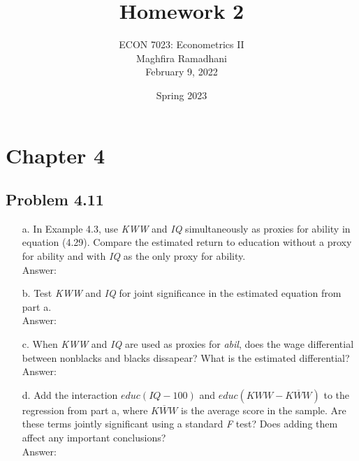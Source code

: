 \documentclass[10pt]{article}
\begin{document}
 
\title{Homework 2}
\author{ECON 7023: Econometrics II\\
Maghfira Ramadhani\\
February 9, 2022}
\date{Spring 2023}
\maketitle

\section*{Chapter 4}
\subsection*{Problem 4.11}
\begin{enumerate}
\item[a.] In Example 4.3, use \textit{KWW} and \textit{IQ} simultaneously as proxies for ability in equation (4.29). Compare the estimated return to education without a proxy for ability and with \textit{IQ} as the only proxy for ability.
\\ Answer: \\

\item[b.] Test \textit{KWW} and \textit{IQ} for joint significance in the estimated equation from part a.
\\ Answer:\\

\item[c.] When \textit{KWW} and \textit{IQ} are used as proxies for \textit{abil}, does the wage differential between nonblacks and blacks dissapear? What is the estimated differential?
\\ Answer:\\

\item[d.] Add the interaction $educ(IQ-100)$ and $educ(KWW-\overline{KWW})$ to the regression from part a, where $\overline{KWW}$ is the average score in the sample. Are these terms jointly significant using a standard \textit{F} test? Does adding them affect any important conclusions?
\\ Answer:\\
\end{enumerate}
\end{document}
